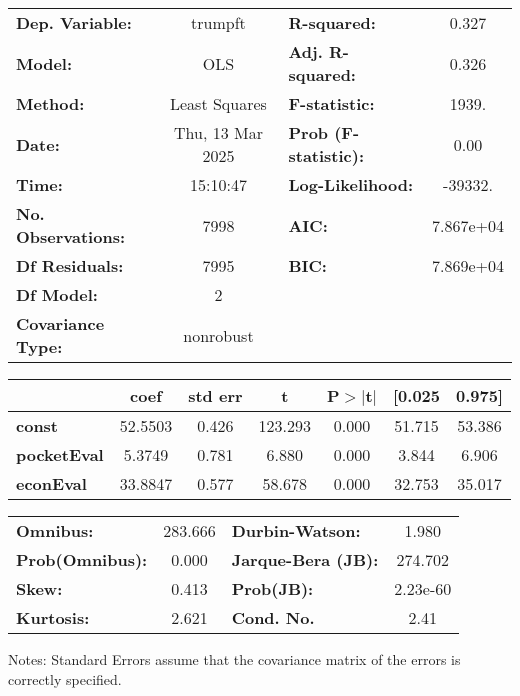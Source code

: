 \begin{center}
\begin{tabular}{lclc}
\toprule
\textbf{Dep. Variable:}    &     trumpft      & \textbf{  R-squared:         } &     0.327   \\
\textbf{Model:}            &       OLS        & \textbf{  Adj. R-squared:    } &     0.326   \\
\textbf{Method:}           &  Least Squares   & \textbf{  F-statistic:       } &     1939.   \\
\textbf{Date:}             & Thu, 13 Mar 2025 & \textbf{  Prob (F-statistic):} &     0.00    \\
\textbf{Time:}             &     15:10:47     & \textbf{  Log-Likelihood:    } &   -39332.   \\
\textbf{No. Observations:} &        7998      & \textbf{  AIC:               } & 7.867e+04   \\
\textbf{Df Residuals:}     &        7995      & \textbf{  BIC:               } & 7.869e+04   \\
\textbf{Df Model:}         &           2      & \textbf{                     } &             \\
\textbf{Covariance Type:}  &    nonrobust     & \textbf{                     } &             \\
\bottomrule
\end{tabular}
\begin{tabular}{lcccccc}
                    & \textbf{coef} & \textbf{std err} & \textbf{t} & \textbf{P$> |$t$|$} & \textbf{[0.025} & \textbf{0.975]}  \\
\midrule
\textbf{const}      &      52.5503  &        0.426     &   123.293  &         0.000        &       51.715    &       53.386     \\
\textbf{pocketEval} &       5.3749  &        0.781     &     6.880  &         0.000        &        3.844    &        6.906     \\
\textbf{econEval}   &      33.8847  &        0.577     &    58.678  &         0.000        &       32.753    &       35.017     \\
\bottomrule
\end{tabular}
\begin{tabular}{lclc}
\textbf{Omnibus:}       & 283.666 & \textbf{  Durbin-Watson:     } &    1.980  \\
\textbf{Prob(Omnibus):} &   0.000 & \textbf{  Jarque-Bera (JB):  } &  274.702  \\
\textbf{Skew:}          &   0.413 & \textbf{  Prob(JB):          } & 2.23e-60  \\
\textbf{Kurtosis:}      &   2.621 & \textbf{  Cond. No.          } &     2.41  \\
\bottomrule
\end{tabular}
\end{center}

Notes: \newline
 [1] Standard Errors assume that the covariance matrix of the errors is correctly specified.